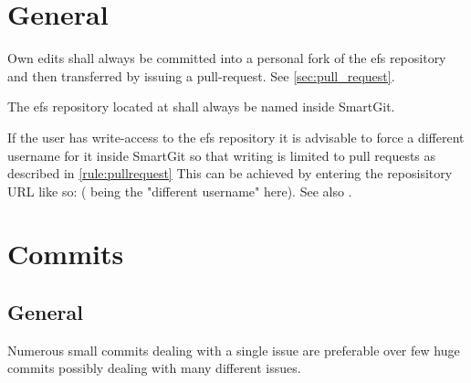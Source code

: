 \documentclass[draft]{efsguide}
\begin{document}
\section{General}
\begin{rules}
\item \label{rule:pullrequest} Own edits shall always be committed into a personal fork of the \gls{efs} repository and then transferred by issuing a pull-request. See \ref{sec:pull_request}. 
\item The \gls{efs} repository located at  shall always be named  inside SmartGit. 
\item If the user has write-access to the \gls{efs} repository it is advisable to force a different username for it inside SmartGit so that writing is limited to pull requests as described in \ref{rule:pullrequest} This can be achieved by entering the reposisitory URL like so:  ( being the "different username" here). See also \cite{gitworkflow}. 

\end{rules}


\section{Commits}
\subsection{General}
\begin{rules}
\item \label{rule:smallcommits} Numerous small commits dealing with a single issue are preferable over few huge commits possibly dealing with many different issues. 
\end{rules}
\end{document}
